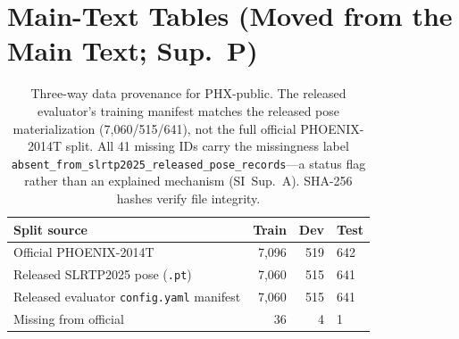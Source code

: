 \documentclass[pdflatex,sn-chicago]{sn-jnl}
\begin{document}
\section{Main-Text Tables (Moved from the Main Text; Sup.~P)}
\label{sec:appendix_moved_tables}

\begin{table}[t]
\centering
\scriptsize
\caption{Three-way data provenance for PHX-public. The released evaluator's training manifest matches the released pose materialization (7{,}060/515/641), not the full official PHOENIX-2014T split. All 41 missing IDs carry the missingness label \texttt{absent\_from\_slrtp2025\_released\_pose\_records}---a status flag rather than an explained mechanism (SI~Sup.~A). SHA-256 hashes verify file integrity.}
\label{tab:provenance}
\begin{tabular}{lrrp{3.5cm}}
\toprule
Split source & Train & Dev & Test \\
\midrule
Official PHOENIX-2014T & 7{,}096 & 519 & 642 \\
Released SLRTP2025 pose (\texttt{.pt}) & 7{,}060 & 515 & 641 \\
Released evaluator \texttt{config.yaml} manifest & 7{,}060 & 515 & 641 \\
\midrule
Missing from official & 36 & 4 & 1 \\
\bottomrule
\end{tabular}
\end{table}
\end{document}
